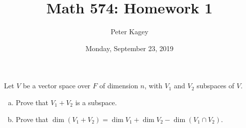 \documentclass{article}
\begin{document}
\title{Math 574: Homework 1}
\author{Peter Kagey}
\date{Monday, September 23, 2019}

\maketitle

\begin{problem}{1} Let $V$ be a vector space over $F$ of dimension $n$, with
  $V_1$ and $V_2$ subspaces of $V$.
  \begin{enumerate}[(a)]
    \item Prove that $V_1 + V_2$ is a subspace.
    \item Prove that $\dim(V_1 + V_2) = \dim V_1 + \dim V_2 - \dim(V_1 \cap V_2)$.
  \end{enumerate}
\end{problem}
\end{document}

